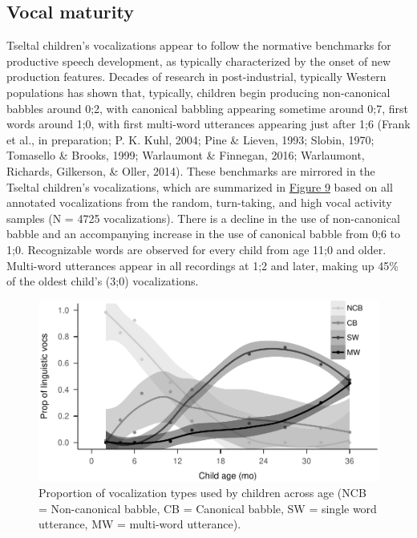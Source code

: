 \documentclass[floatsintext,man]{apa6}
\theoremstyle{definition}
\theoremstyle{definition}
\theoremstyle{definition}
\theoremstyle{remark}
\begin{document}
\subsection{Vocal maturity}\label{vocal-maturity}

Tseltal children's vocalizations appear to follow the normative
benchmarks for productive speech development, as typically characterized
by the onset of new production features. Decades of research in
post-industrial, typically Western populations has shown that,
typically, children begin producing non-canonical babbles around 0;2,
with canonical babbling appearing sometime around 0;7, first words
around 1;0, with first multi-word utterances appearing just after 1;6
(Frank et al., in preparation; P. K. Kuhl, 2004; Pine \& Lieven, 1993;
Slobin, 1970; Tomasello \& Brooks, 1999; Warlaumont \& Finnegan, 2016;
Warlaumont, Richards, Gilkerson, \& Oller, 2014). These benchmarks are
mirrored in the Tseltal children's vocalizations, which are summarized
in \protect\hyperlink{fig9}{Figure 9} based on all annotated
vocalizations from the random, turn-taking, and high vocal activity
samples (N = 4725 vocalizations). There is a decline in the use of
non-canonical babble and an accompanying increase in the use of
canonical babble from 0;6 to 1;0. Recognizable words are observed for
every child from age 11;0 and older. Multi-word utterances appear in all
recordings at 1;2 and later, making up 45\% of the oldest child's (3;0)
vocalizations.

\begin{figure}
\centering
\includegraphics{Tseltal-CLE_files/figure-latex/fig9-1.pdf}
\caption{\label{fig:fig9}Proportion of vocalization types used by children
across age (NCB = Non-canonical babble, CB = Canonical babble, SW =
single word utterance, MW = multi-word utterance).}
\end{figure}
\end{document}

